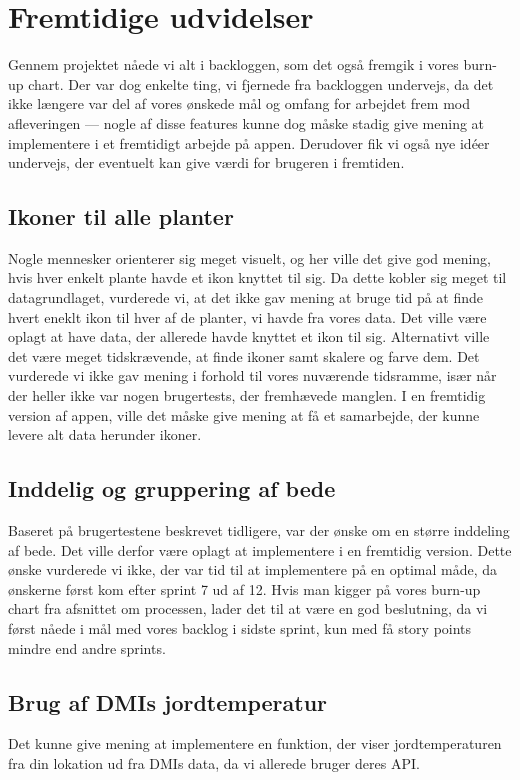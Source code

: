 \section{Fremtidige udvidelser}
Gennem projektet nåede vi alt i backloggen, som det også fremgik i vores burn-up chart. Der var dog enkelte ting, vi fjernede fra backloggen undervejs, da det ikke længere var del af vores ønskede mål og omfang for arbejdet frem mod afleveringen --- nogle af disse features kunne dog måske stadig give mening at implementere i et fremtidigt arbejde på appen. Derudover fik vi også nye idéer undervejs, der eventuelt kan give værdi for brugeren i fremtiden.

\subsection{Ikoner til alle planter}
Nogle mennesker orienterer sig meget visuelt, og her ville det give god mening, hvis hver enkelt plante havde et ikon knyttet til sig. Da dette kobler sig meget til datagrundlaget, vurderede vi, at det ikke gav mening at bruge tid på at finde hvert eneklt ikon til hver af de planter, vi havde fra vores data. Det ville være oplagt at have data, der allerede havde knyttet et ikon til sig. Alternativt ville det være meget tidskrævende, at finde ikoner samt skalere og farve dem. Det vurderede vi ikke gav mening i forhold til vores nuværende tidsramme, især når der heller ikke var nogen brugertests, der fremhævede manglen. I en fremtidig version af appen, ville det måske give mening at få et samarbejde, der kunne levere alt data herunder ikoner. 

\label{gruppering-af-bede}
\subsection{Inddelig og gruppering af bede}
Baseret på brugertestene beskrevet tidligere, var der ønske om en større inddeling af bede. Det ville derfor være oplagt at implementere i en fremtidig version. Dette ønske vurderede vi ikke, der var tid til at implementere på en optimal måde, da ønskerne først kom efter sprint 7 ud af 12. Hvis man kigger på vores burn-up chart fra afsnittet om processen, lader det til at være en god beslutning, da vi først nåede i mål med vores backlog i sidste sprint, kun med få story points mindre end andre sprints.

\subsection{Brug af DMIs jordtemperatur}
Det kunne give mening at implementere en funktion, der viser jordtemperaturen fra din lokation ud fra DMIs data, da vi allerede bruger deres API.

